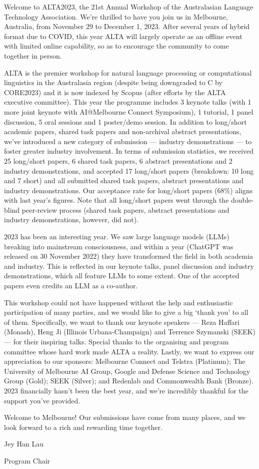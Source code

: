 Welcome to ALTA2023, the 21st Annual Workshop of the Australasian Language Technology Association. We're thrilled to have you join us in Melbourne, Australia, from November 29 to December 1, 2023. After several years of hybrid format due to COVID, this year ALTA will largely operate as an offline event with limited online capability, so as to encourage the community to come together in person.\newline

ALTA is the premier workshop for natural language processing or computational linguistics in the Australasia region (despite being downgraded to C by CORE2023) and it is now indexed by Scopus (after efforts by the ALTA executive committee). This year the programme includes 3 keynote talks (with 1 more joint keynote with AI@Melbourne Connect Symposium), 1 tutorial, 1 panel discussion, 5 oral sessions and 1 poster/demo session. In addition to long/short academic papers, shared task papers and non-archival abstract presentations, we've introduced a new category of submission --- industry demonstrations --- to foster greater industry involvement. In terms of submission statistics, we received 25 long/short papers, 6 shared task papers, 6 abstract presentations and 2 industry demonstrations, and accepted 17 long/short papers (breakdown: 10 long and 7 short) and all submitted shared task papers, abstract presentations and industry demonstrations. Our acceptance rate for long/short papers (68\%) aligns with last year's figures. Note that all long/short papers went through the double-blind peer-review process (shared task papers, abstract presentations and industry demonstrations, however, did not). \newline

2023 has been an interesting year. We saw large language models (LLMs) breaking into mainstream consciousness, and within a year (ChatGPT was released on 30 November 2022) they have transformed the field in both academia and industry. This is reflected in our keynote talks, panel discussion and industry demonstrations, which all feature LLMs to some extent. One of the accepted papers even credits an LLM as a co-author.\newline

This workshop could not have happened without the help and enthusiastic participation of many parties, and we would like to give a big `thank you' to all of them. Specifically, we want to thank our keynote speakers --- Reza Haffari (Monash), Heng Ji (Illinois Urbana-Champaign) and Terrence Szymanski (SEEK) --- for their inspiring talks. Special thanks to the organising and program committee whose hard work made ALTA a reality. Lastly, we want to express our appreciation to our sponsors: Melbourne Connect and Telstra (Platinum); The University of Melbourne AI Group, Google and Defense Science and Technology Group (Gold); SEEK (Silver); and Redenlab and Commonwealth Bank (Bronze). 2023 financially hasn't been the best year, and we're incredibly thankful for the support you've provided.\newline

Welcome to Melbourne! Our submissions have come from many places, and we look forward to a rich and rewarding time together.\newline\newline\newline

Jey Han Lau\newline

Program Chair
